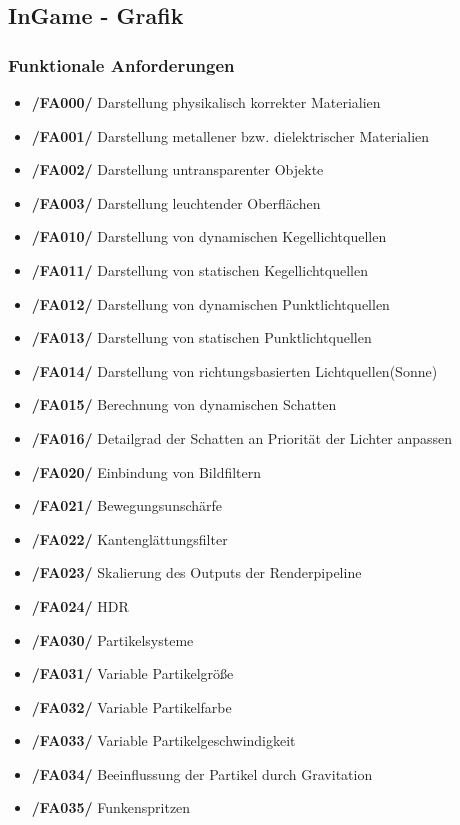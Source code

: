 \documentclass[parskip=full]{scrartcl}
\begin{document}
	\subsection{InGame - Grafik}
	\subsubsection{Funktionale Anforderungen}
	\begin{itemize}[label={}]
		\item \textbf{/FA000/} Darstellung physikalisch korrekter Materialien
		\item \textbf{/FA001/} Darstellung metallener bzw. dielektrischer Materialien
		\item \textbf{/FA002/} Darstellung untransparenter Objekte
		\item \textbf{/FA003/} Darstellung leuchtender Oberflächen
		
		\item \textbf{/FA010/} Darstellung von dynamischen Kegellichtquellen
		\item \textbf{/FA011/} Darstellung von statischen Kegellichtquellen
		\item \textbf{/FA012/} Darstellung von dynamischen Punktlichtquellen
		\item \textbf{/FA013/} Darstellung von statischen Punktlichtquellen
		\item \textbf{/FA014/} Darstellung von richtungsbasierten Lichtquellen(Sonne)
		\item \textbf{/FA015/} Berechnung  von dynamischen Schatten
		\item \textbf{/FA016/} Detailgrad der Schatten an Priorität der Lichter anpassen
		
		\item \textbf{/FA020/} Einbindung von Bildfiltern
		\item \textbf{/FA021/} Bewegungsunschärfe
		\item \textbf{/FA022/} Kantenglättungsfilter
		\item \textbf{/FA023/} Skalierung des Outputs der Renderpipeline
		\item \textbf{/FA024/} \gls{HDR}
		
		\item \textbf{/FA030/} Partikelsysteme
		\item \textbf{/FA031/} Variable Partikelgröße
		\item \textbf{/FA032/} Variable Partikelfarbe
		\item \textbf{/FA033/} Variable Partikelgeschwindigkeit
		\item \textbf{/FA034/} Beeinflussung der Partikel durch Gravitation
		\item \textbf{/FA035/} Funkenspritzen
		

\end{itemize}
\end{document}
